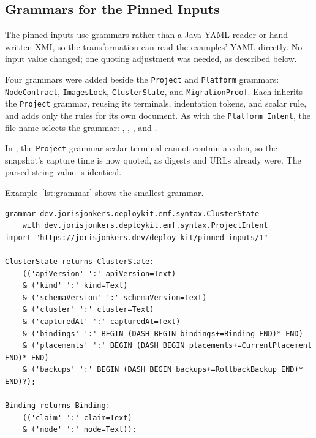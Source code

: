 \subsection{Grammars for the Pinned Inputs}
\label{app:grammars}

The pinned inputs use grammars rather than a Java YAML reader or hand-written
XMI, so the transformation can read the examples' YAML directly. No input
value changed; one quoting adjustment was needed, as described below.

Four grammars were added beside the \texttt{Project} and \texttt{Platform} grammars:
\texttt{NodeContract}, \texttt{ImagesLock}, \texttt{ClusterState}, and \texttt{MigrationProof}. Each inherits the
\texttt{Project} grammar, reusing its terminals, indentation tokens, and scalar rule,
and adds only the rules for its own document. As with the \texttt{Platform Intent},
the file name selects the grammar: ,
, , and .

In , the \texttt{Project} grammar scalar terminal cannot contain a
colon, so the snapshot's capture time is now quoted, as digests and URLs already
were. The parsed string value is identical.

Example~\ref{lst:grammar} shows the smallest grammar.

\begin{lstlisting}[style=report, caption={The Grammar of the \texttt{ClusterState} Snapshot, Abridged}, label={lst:grammar}]
grammar dev.jorisjonkers.deploykit.emf.syntax.ClusterState
	with dev.jorisjonkers.deploykit.emf.syntax.ProjectIntent
import "https://jorisjonkers.dev/deploy-kit/pinned-inputs/1"

ClusterState returns ClusterState:
	(('apiVersion' ':' apiVersion=Text)
	& ('kind' ':' kind=Text)
	& ('schemaVersion' ':' schemaVersion=Text)
	& ('cluster' ':' cluster=Text)
	& ('capturedAt' ':' capturedAt=Text)
	& ('bindings' ':' BEGIN (DASH BEGIN bindings+=Binding END)* END)
	& ('placements' ':' BEGIN (DASH BEGIN placements+=CurrentPlacement END)* END)
	& ('backups' ':' BEGIN (DASH BEGIN backups+=RollbackBackup END)* END)?);

Binding returns Binding:
	(('claim' ':' claim=Text)
	& ('node' ':' node=Text));
\end{lstlisting}

